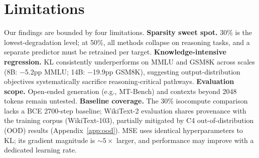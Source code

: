 \section*{Limitations}

Our findings are bounded by four limitations.
\textbf{Sparsity sweet spot.} 30\% is the lowest-degradation level; at 50\%, all methods collapse on reasoning tasks, and a separate predictor must be retrained per target.
\textbf{Knowledge-intensive regression.} KL consistently underperforms on MMLU and GSM8K across scales (8B: $-$5.2pp MMLU; 14B: $-$19.9pp GSM8K), suggesting output-distribution objectives systematically sacrifice reasoning-critical pathways.
\textbf{Evaluation scope.} Open-ended generation (e.g., MT-Bench) and contexts beyond 2048 tokens remain untested.
\textbf{Baseline coverage.} The 30\% isocompute comparison lacks a BCE 2700-step baseline; WikiText-2 evaluation shares provenance with the training corpus (WikiText-103), partially mitigated by C4 out-of-distribution (OOD) results (Appendix~\ref{app:ood}). MSE uses identical hyperparameters to KL; its gradient magnitude is ${\sim}5\times$ larger, and performance may improve with a dedicated learning rate.
